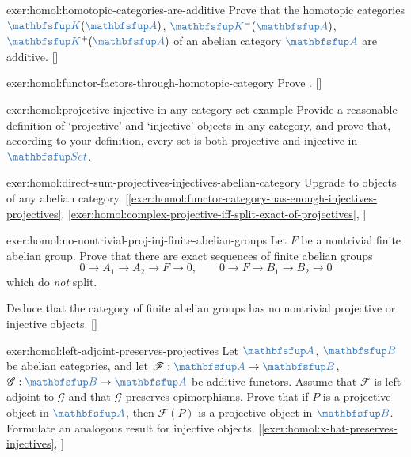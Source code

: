 \begin{exer}{\exerused{}}{exer:homol:homotopic-categories-are-additive}
  Prove that the homotopic categories $\categ{K}(\categ{A})$,
  $\categ{K}^-(\categ{A})$, $\categ{K}^+(\categ{A})$ of an abelian
  category $\categ{A}$ are
  additive. []
\end{exer}
\begin{exer}{\exerused{}}{exer:homol:functor-factors-through-homotopic-category}
  Prove
  . []
\end{exer}
\begin{exer}{}{exer:homol:projective-injective-in-any-category-set-example}
  Provide a reasonable definition of `projective' and `injective'
  objects in any category, and prove that, according to your
  definition, every set is both projective and injective in
  $\categ{Set}$.
\end{exer}
\begin{exer}{\exerused{}}{exer:homol:direct-sum-projectives-injectives-abelian-category}
  Upgrade
  to objects of any abelian
  category. [\ref{exer:homol:functor-category-has-enough-injectives-projectives},
  \ref{exer:homol:complex-projective-iff-split-exact-of-projectives},
  ]
\end{exer}
\begin{exer}{\exerused{}}{exer:homol:no-nontrivial-proj-inj-finite-abelian-groups}
  Let $F$ be a nontrivial finite abelian group. Prove that there are
  exact sequences of finite abelian groups
  \[
    0 \to A_1 \to A_2 \to F \to 0, \qquad 0 \to F \to B_1 \to B_2 \to
    0
  \]
  which do \emph{not} split.

  Deduce that the category of finite abelian groups has no nontrivial
  projective or injective
  objects. []
\end{exer}
\begin{exer}{\exerused{}}{exer:homol:left-adjoint-preserves-projectives}
  Let $\categ{A}$, $\categ{B}$ be abelian categories, and let
  $\mathscr{F} : \categ{A} \to \categ{B}$,
  $\mathscr{G} : \categ{B} \to \categ{A}$ be additive functors. Assume
  that $\mathscr{F}$ is left-adjoint to $\mathscr{G}$ and that
  $\mathscr{G}$ preserves epimorphisms. Prove that if $P$ is a
  projective object in $\categ{A}$, then $\mathscr{F}(P)$ is a
  projective object in $\categ{B}$. Formulate an analogous result for
  injective objects.  [\ref{exer:homol:x-hat-preserves-injectives},
  ]
\end{exer}
